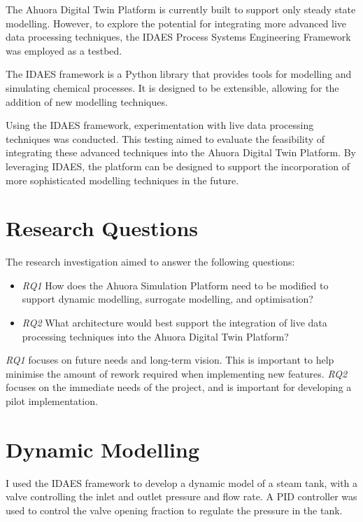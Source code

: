 \documentclass[12pt]{report}
\begin{document}
The Ahuora Digital Twin Platform is currently built to support only steady state modelling. However, to explore the potential for integrating more advanced live data processing techniques, the IDAES Process Systems Engineering Framework was employed as a testbed.

The IDAES framework is a Python library that provides tools for modelling and simulating chemical processes. It is designed to be extensible, allowing for the addition of new modelling techniques.

Using the IDAES framework, experimentation with live data processing techniques was conducted. This testing aimed to evaluate the feasibility of integrating these advanced techniques into the Ahuora Digital Twin Platform. By leveraging IDAES, the platform can be designed to support the incorporation of more sophisticated modelling techniques in the future.

\section{Research Questions}

The research investigation aimed to answer the following questions:

\begin{itemize}
    \item \textit{RQ1} How does the Ahuora Simulation Platform need to be modified to support dynamic modelling, surrogate modelling, and optimisation?
    \item \textit{RQ2} What architecture would best support the integration of live data processing techniques into the Ahuora Digital Twin Platform?
\end{itemize}

\textit{RQ1} focuses on future needs and long-term vision. This is important to help minimise the amount of rework required when implementing new features. \textit{RQ2} focuses on the immediate needs of the project, and is important for developing a pilot implementation.

\section{Dynamic Modelling}

I used the IDAES framework to develop a dynamic model of a steam tank, with a valve controlling the inlet and outlet pressure and flow rate. A PID controller was used to control the valve opening fraction to regulate the pressure in the tank.
\end{document}
